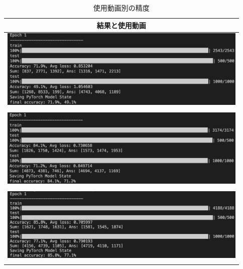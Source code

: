\begin{table}[b]
  \centering
  \begin{tabular}{|c|} \hline
    結果と使用動画 \\ \hline
    \includegraphics[width=120mm]{images/net_result/result10.png}
    \\
    \cite{ballet}\cite{thai}\cite{jpn2}
    \cite{kadokawa}\cite{bts}\cite{manolo}
    \cite{posing}\cite{boxing}\cite{shinkokyu}\cite{leaves}
    \\ \hline
    \includegraphics[width=120mm]{images/net_result/result13.png}
    \\
    \cite{jpn}\cite{ballet}\cite{thai}\cite{jpn2}
    \cite{ariana}\cite{kadokawa}\cite{bts}\cite{manolo}
    \cite{posing}\cite{boxing}\cite{running}\cite{shinkokyu}\cite{leaves}
    \\ \hline
    \includegraphics[width=120mm]{images/net_result/result16.png}
    \\
    \cite{jpn}\cite{china}\cite{ballet}\cite{thai}\cite{jpn2}
    \cite{ariana}\cite{kadokawa}\cite{bts}\cite{manolo}\cite{aito}
    \cite{radio}\cite{posing}\cite{boxing}\cite{running}\cite{shinkokyu}\cite{leaves}
    \\ \hline
  \end{tabular}
  \caption{使用動画別の精度}
  \label{result}
\end{table}
\clearpage

